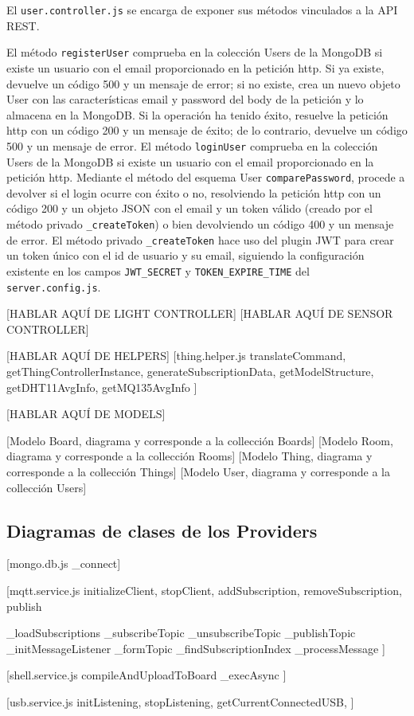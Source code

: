 \vspace{1cm}

El \verb|user.controller.js| se encarga de exponer sus métodos vinculados a la API REST.

\vspace{0.5cm}

El método \verb|registerUser| comprueba en la colección Users de la MongoDB si existe un usuario con el email proporcionado en la petición http. Si ya existe, devuelve un código 500 y un mensaje de error; si no existe, crea un nuevo objeto User con las características email y password del body de la petición y lo almacena en la MongoDB. Si la operación ha tenido éxito, resuelve la petición http con un código 200 y un mensaje de éxito; de lo contrario, devuelve un código 500 y un mensaje de error.
El método \verb|loginUser| comprueba en la colección Users de la MongoDB si existe un usuario con el email proporcionado en la petición http. Mediante el método del esquema User \verb|comparePassword|, procede a devolver si el login ocurre con éxito o no, resolviendo la petición http con un código 200 y un objeto JSON con el email y un token válido (creado por el método privado \verb|_createToken|) o bien devolviendo un código 400 y un mensaje de error.
El método privado \verb|_createToken| hace uso del plugin JWT para crear un token único con el id de usuario y su email, siguiendo la configuración existente en los campos \verb|JWT_SECRET| y \verb|TOKEN_EXPIRE_TIME| del \verb|server.config.js|.

[HABLAR AQUÍ DE LIGHT CONTROLLER]
[HABLAR AQUÍ DE SENSOR CONTROLLER]

[HABLAR AQUÍ DE HELPERS]
[thing.helper.js
  translateCommand,
  getThingControllerInstance,
  generateSubscriptionData,
  getModelStructure,
  getDHT11AvgInfo,
  getMQ135AvgInfo
]

[HABLAR AQUÍ DE MODELS]

[Modelo Board, diagrama y corresponde a la collección Boards]
[Modelo Room, diagrama y corresponde a la collección Rooms]
[Modelo Thing, diagrama y corresponde a la collección Things]
[Modelo User, diagrama y corresponde a la collección Users]

\subsection{Diagramas de clases de los Providers}
\label{makereference4.7.5}

[mongo.db.js _connect]

[mqtt.service.js
  initializeClient,
  stopClient,
  addSubscription,
  removeSubscription,
  publish
  
  _loadSubscriptions
  _subscribeTopic
  _unsubscribeTopic
  _publishTopic
  _initMessageListener
  _formTopic
  _findSubscriptionIndex
  _processMessage
  ]
  
  [shell.service.js 
  compileAndUploadToBoard
  _execAsync
  ]

  [usb.service.js 
  initListening,
  stopListening,
  getCurrentConnectedUSB,
  ]